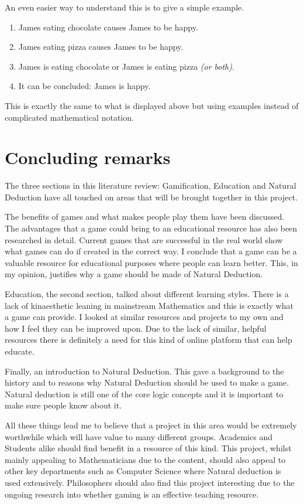 \documentclass[a4paper]{article}
\begin{document}
An even easier way to understand this is to give a simple example.
\begin{enumerate}
\item{James eating chocolate causes James to be happy.}
\item{James eating pizza causes James to be happy.}
\item{James is eating chocolate or James is eating pizza \textit{(or both)}.}
\item{It can be concluded: James is happy.}
\end{enumerate}

This is exactly the same to what is displayed above but using examples instead of complicated mathematical notation.

\cite{LogicND} \cite{intro} \cite{philNadDed}

\section{Concluding remarks}

The three sections in this literature review: Gamification, Education and Natural Deduction have all touched on areas that will be brought together in this project. 

The benefits of games and what makes people play them have been discussed. The advantages that a game could bring to an educational resource has also been researched in detail. Current games that are successful in the real world show what games can do if created in the correct way. I conclude that a game can be a valuable resource for educational purposes where people can learn better. This, in my opinion, justifies why a game should be made of Natural Deduction.

Education, the second section, talked about different learning styles. There is a lack of kinaesthetic leaning in mainstream Mathematics and this is exactly what a game can provide. I looked at similar resources and projects to my own and how I feel they can be improved upon. Due to the lack of similar, helpful resources there is definitely a need for this kind of online platform that can help educate.

Finally, an introduction to Natural Deduction. This gave a background to the history and to reasons why Natural Deduction should be used to make a game. Natural deduction is still one of the core logic concepts and it is important to make sure people know about it. 

All these things lead me to believe that a project in this area would be extremely worthwhile which will have value to many different groups. Academics and Students alike should find benefit in a resource of this kind. This project, whilst mainly appealing to Mathematicians due to the content, should also appeal to other key departments such as Computer Science where Natural deduction is used extensively. Philosophers should also find this project interesting due to the ongoing research into whether gaming is an effective teaching resource.    

\newpage

\end{document}
